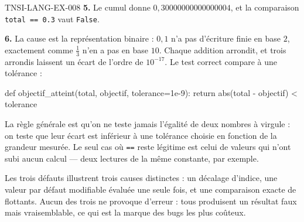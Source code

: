 \begin{corrige}{TNSI-LANG-EX-008}
\textbf{5.} Le cumul donne $0{,}30000000000000004$, et la comparaison
\lstinline{total == 0.3} vaut \lstinline{False}.

\textbf{6.} La cause est la représentation binaire : $0{,}1$ n'a pas d'écriture
finie en base $2$, exactement comme $\tfrac13$ n'en a pas en base $10$. Chaque
addition arrondit, et trois arrondis laissent un écart de l'ordre de $10^{-17}$.
Le test correct compare à une tolérance :
\begin{python}
def objectif_atteint(total, objectif, tolerance=1e-9):
    return abs(total - objectif) < tolerance
\end{python}
La règle générale est qu'on ne teste jamais l'égalité de deux nombres à virgule :
on teste que leur écart est inférieur à une tolérance choisie en fonction de la
grandeur mesurée. Le seul cas où \lstinline{==} reste légitime est celui de
valeurs qui n'ont subi aucun calcul — deux lectures de la même constante, par
exemple.

\medskip
Les trois défauts illustrent trois causes distinctes : un décalage d'indice, une
valeur par défaut modifiable évaluée une seule fois, et une comparaison exacte de
flottants. Aucun des trois ne provoque d'erreur : tous produisent un résultat
faux mais vraisemblable, ce qui est la marque des bugs les plus coûteux.
\end{corrige}
